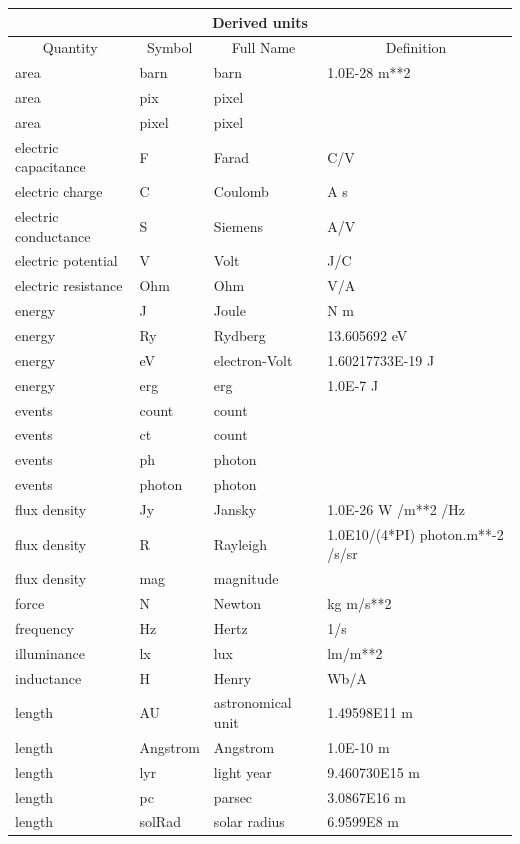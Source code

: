 \documentclass[twoside,11pt]{article}
\begin{document}
\begin{table}[htbp]
\begin{center}
\begin{tabular}{|l|l|l|l|}
\hline
\multicolumn{4}{|c|}{{\large Derived units}} \\ \hline
\multicolumn{1}{|c|}{Quantity} & \multicolumn{1}{|c|}{Symbol} &
\multicolumn{1}{c|}{Full Name} & \multicolumn{1}{c|}{Definition} \\ \hline
area & barn & barn & 1.0E-28 m**2 \\
area & pix & pixel & \\
area & pixel & pixel & \\
electric capacitance & F & Farad & C/V \\
electric charge & C & Coulomb & A s \\
electric conductance & S & Siemens & A/V \\
electric potential & V & Volt & J/C \\
electric resistance & Ohm & Ohm & V/A \\
energy & J & Joule & N m \\
energy & Ry & Rydberg & 13.605692 eV \\
energy & eV & electron-Volt & 1.60217733E-19 J \\
energy & erg & erg & 1.0E-7 J \\
events & count & count & \\
events & ct & count & \\
events & ph & photon & \\
events & photon & photon & \\
flux density & Jy & Jansky & 1.0E-26 W /m**2 /Hz \\
flux density & R & Rayleigh & 1.0E10/(4*PI) photon.m**-2 /s/sr \\
flux density & mag & magnitude & \\
force & N & Newton & kg m/s**2 \\
frequency & Hz & Hertz & 1/s \\
illuminance & lx & lux & lm/m**2 \\
inductance & H & Henry & Wb/A \\
length & AU & astronomical unit & 1.49598E11 m \\
length & Angstrom & Angstrom & 1.0E-10 m \\
length & lyr & light year & 9.460730E15 m \\
length & pc & parsec & 3.0867E16 m \\
length & solRad & solar radius & 6.9599E8 m \\

\end{tabular}
\end{center}
\end{table}
\end{document}
